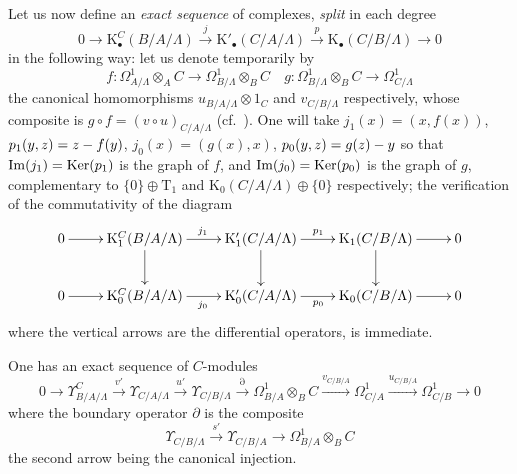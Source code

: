\begin{env}[20.6.16]
\label{0.20.6.16}
Let us now define an \emph{exact sequence} of complexes, \emph{split} in each degree
\begin{equation}
\tag{20.6.16.1}
  \label{0.20.6.16.1}
  0\to\mathrm{K}^C_\bullet(B/A/\Lambda)\xrightarrow{j}\mathrm{K}'_\bullet(C/A/\Lambda)\xrightarrow{p}\mathrm{K}_\bullet(C/B/\Lambda)\to 0
\end{equation}
in the following way: let us denote temporarily by
\[
  f:\Omega^1_{A/\Lambda}\otimes_A C\to\Omega^1_{B/\Lambda}\otimes_B C \quad
  g:\Omega^1_{B/\Lambda}\otimes_B C\to\Omega^1_{C/\Lambda}
\]
the canonical homomorphisms $u_{B/A/\Lambda}\otimes 1_C$ and $v_{C/B/\Lambda}$ respectively, whose composite is $g\circ f=(v\circ u)_{C/A/\Lambda}$ (cf.\ ).
One will take $j_1(x)=(x,f(x))$, $p_1(y,z)=z- f(y)$, $j_0(x)=(g(x),x)$, $p_0(y,z)=g(z)- y$ so that $\operatorname{Im}(j_1)=\operatorname{Ker}(p_1)$ is the graph of $f$, and $\operatorname{Im}(j_0)=\operatorname{Ker}(p_0)$ is the graph of $g$, complementary to $\{0\}\oplus\mathrm{T}_1$ and $\mathrm{K}_0(C/A/\Lambda)\oplus\{0\}$ respectively; the verification of the commutativity of the diagram
\[
\xymatrix{
  0 \ar[r] & \mathrm{K}^C_1(B/A/\Lambda) \ar[r]^{j_1} \ar[d] & \mathrm{K}'_1(C/A/\Lambda) \ar[r]^{p_1} \ar[d] & \mathrm{K}_1(C/B/\Lambda) \ar[r] \ar[d] & 0 \\
  0 \ar[r] & \mathrm{K}^C_0(B/A/\Lambda) \ar[r]_{j_0} & \mathrm{K}'_0(C/A/\Lambda) \ar[r]_{p_0} & \mathrm{K}_0(C/B/\Lambda) \ar[r] & 0
}
\]
where the vertical arrows are the differential operators, is immediate.
\end{env}

\begin{theorem}[20.6.17]
\label{0.20.6.17}
One has an exact sequence of $C$-modules
\begin{equation}
\tag{20.6.17.1}
  \label{0.20.6.17.1}
  0\to\Upsilon^C_{B/A/\Lambda}\xrightarrow{v'}\Upsilon_{C/A/\Lambda}\xrightarrow{u'}\Upsilon_{C/B/\Lambda}\xrightarrow{\partial}\Omega^1_{B/A}\otimes_B C\xrightarrow{v_{C/B/A}}\Omega^1_{C/A}\xrightarrow{u_{C/B/A}}\Omega^1_{C/B}\to 0
\end{equation}
where the boundary operator $\partial$ is the composite
\begin{equation}
\tag{20.6.17.2}
  \label{0.20.6.17.2}
  \Upsilon_{C/B/\Lambda}\xrightarrow{s'}\Upsilon_{C/B/A}\to\Omega^1_{B/A}\otimes_B C
\end{equation}
the second arrow being the canonical injection.
\end{theorem}

